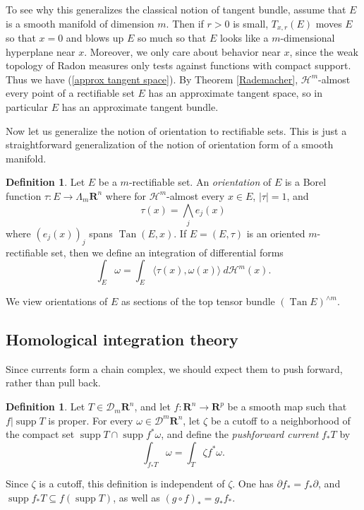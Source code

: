 \documentclass[reqno,12pt,letterpaper]{amsart}
\newcommand{\RR}{\mathbf{R}}
\DeclareMathOperator{\supp}{supp}
\DeclareMathOperator{\Tan}{Tan}
\newcommand{\dfn}[1]{\emph{#1}\index{#1}}
\theoremstyle{definition}
\newtheorem{definition}[theorem]{Definition}
\numberwithin{equation}{section}
\begin{document}
To see why this generalizes the classical notion of tangent bundle, assume that $E$ is a smooth manifold of dimension $m$.
Then if $r > 0$ is small, $T_{x,r}(E)$ moves $E$ so that $x = 0$ and blows up $E$ so much so that $E$ looks like a $m$-dimensional hyperplane near $x$.
Moreover, we only care about behavior near $x$, since the weak topology of Radon measures only tests against functions with compact support.
Thus we have (\ref{approx tangent space}). By Theorem \ref{Rademacher}, $\mathcal H^m$-almost every point of a rectifiable set $E$ has an approximate tangent space, so in particular $E$ has an approximate tangent bundle.

Now let us generalize the notion of orientation to rectifiable sets.
This is just a straightforward generalization of the notion of orientation form of a smooth manifold.

\begin{definition}
Let $E$ be a $m$-rectifiable set.
An \dfn{orientation} of $E$ is a Borel function $\tau: E \to \Lambda_m \RR^n$ where for $\mathcal H^m$-almost every $x \in E$, $|\tau| = 1$, and
$$\tau(x) = \bigwedge_j e_j(x)$$
where $(e_j(x))_j$ spans $\Tan(E, x)$.
If $E = (E, \tau)$ is an oriented $m$-rectifiable set, then we define an integration of differential forms
$$\int_E \omega = \int_E \langle \tau(x), \omega(x)\rangle ~d\mathcal H^m(x).$$
\end{definition}

We view orientations of $E$ as sections of the top tensor bundle $(\Tan E)^{\wedge m}$.

\subsection{Homological integration theory}
Since currents form a chain complex, we should expect them to push forward, rather than pull back.

\begin{definition}
Let $T \in \mathcal D_m\RR^n$, and let $f: \RR^n \to \RR^p$ be a smooth map such that $f|\supp T$ is proper.
For every $\omega \in \mathcal D^m\RR^n$, let $\zeta$ be a cutoff to a neighborhood of the compact set $\supp T \cap \supp f^*\omega$, and define the \dfn{pushforward current} $f_*T$ by
$$\int_{f_*T} \omega = \int_T \zeta f^*\omega.$$
\end{definition}

Since $\zeta$ is a cutoff, this definition is independent of $\zeta$.
One has $\partial f_* = f_* \partial$, and $\supp f_* T \subseteq f(\supp T)$, as well as $(g \circ f)_* = g_* f_*$.
\end{document}
